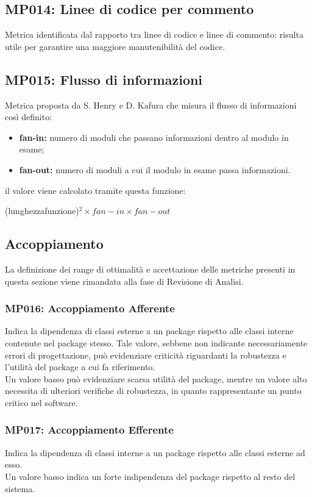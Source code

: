 \subsection{MP014: Linee di codice per commento}
Metrica identificata dal rapporto tra linee di codice e linee di commento: risulta utile per garantire una maggiore manutenibilità del codice.

\subsection{MP015: Flusso di informazioni}
Metrica proposta da S. Henry e D. Kafura che misura il flusso di informazioni così definito:

\begin{itemize}
	\item \textbf{fan-in:} numero di moduli che passano informazioni dentro al modulo in esame;
	\item \textbf{fan-out:} numero di moduli a cui il modulo in esame passa informazioni.
\end{itemize} 
il valore viene calcolato tramite questa funzione:
\begin{center}
	(lunghezzafunzione)$^2\times fan-in\times fan-out$
\end{center}

\subsection{Accoppiamento}
La definizione dei range di ottimalità e accettazione delle metriche presenti in questa sezione viene rimandata alla fase di Revisione di Analisi.
\subsubsection{MP016: Accoppiamento Afferente}
Indica la dipendenza di classi esterne a un package rispetto alle classi interne contenute nel package stesso.
Tale valore, sebbene non indicante necessariamente errori di progettazione, può evidenziare criticità riguardanti la robustezza e l'utilità del package a cui fa riferimento.\\
Un valore basso può evidenziare scarsa utilità del package, mentre un valore alto necessita di ulteriori verifiche di robustezza, in quanto rappresentante un punto critico nel software.
\subsubsection{MP017: Accoppiamento Efferente}
Indica la dipendenza di classi interne a un package rispetto alle classi esterne ad esso.\\
Un valore basso indica un forte indipendenza del package rispetto al resto del sistema.

